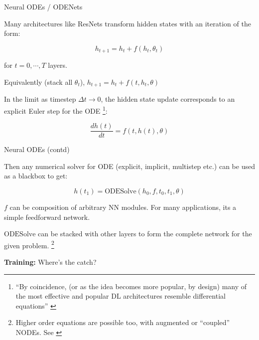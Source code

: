\documentclass[usenames,dvipsnames]{beamer}
\theoremstyle{definition}
\let\oldcite=\cite
\renewcommand{\cite}[2][]{\textcolor{green}{\oldcite[#1]{#2}}}
\begin{document}



\begin{frame}{Neural ODEs / ODENets}

    Many architectures like ResNets transform hidden states with an iteration of the form:
    

    $$h_{t + 1} = h_t + f(h_t, \theta_t)$$

    for $t=0, \cdots, T$ layers. 

    Equivalently (stack all $\theta_t$), $h_{t + 1} = h_t + f(t, h_t, \theta)$

    In the limit as timestep $\Delta t \rightarrow 0$, the hidden state update corresponds to an explicit Euler step for the ODE \footnote{``By coincidence, (or as the idea becomes more popular, by design) many of the most effective and popular DL architectures resemble differential equations'' \cite{kidger_neural_2022}}:
    
    $$\frac{dh(t)}{dt} = f(t, h(t), \theta)$$

\end{frame}

\begin{frame}{Neural ODEs (contd)}

    Then any numerical solver for ODE (explicit, implicit, multistep etc.) can be used as a blackbox to get:

    $$h(t_1) = \textrm{ODESolve}(h_0, f, t_0, t_1, \theta)$$

    $f$ can be composition of arbitrary NN modules. For many applications, its a simple feedforward network.

    $\textrm{ODESolve}$ can be stacked with other layers to form the complete network for the given problem. \footnote{Higher order equations are possible too, with augmented or ``coupled'' NODEs. See \cite{Norcliffe2020}}


    \textbf{Training:} Where's the catch?

\end{frame}
\end{document}
